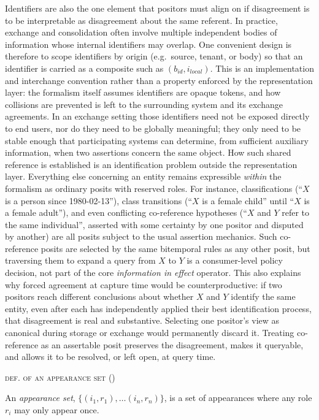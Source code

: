\documentclass[a4paper,fleqn]{cas-sc}
\newcounter{majorcount}
\newcommand{\deffy}[3]{
	\vspace{2ex}
	\refstepcounter{majorcount}
	\noindent\textsc{#1} {\normalfont(\arabic{majorcount})}
	\\\begin{small}
	\noindent #2%
	\label{Def:#3}
	\end{small}
	\vspace{2ex}
}
\begin{document}
Identifiers are also the one element that positors must align on if disagreement is to be interpretable as disagreement about the same referent. In practice, exchange and consolidation often involve multiple independent bodies of information whose internal identifiers may overlap. One convenient design is therefore to scope identifiers by origin (e.g.\ source, tenant, or body) so that an identifier is carried as a composite such as \((b_{id}, i_{local})\). This is an implementation and interchange convention rather than a property enforced by the representation layer: the formalism itself assumes identifiers are opaque tokens, and how collisions are prevented is left to the surrounding system and its exchange agreements. In an exchange setting those identifiers need not be exposed directly to end users, nor do they need to be globally meaningful; they only need to be stable enough that participating systems can determine, from sufficient auxiliary information, when two assertions concern the same object. How such shared reference is established is an identification problem outside the representation layer. Everything else concerning an entity remains expressible \emph{within} the formalism as ordinary posits with reserved roles. For instance, classifications (``\(X\) is a person since 1980-02-13''), class transitions (``\(X\) is a female child'' until ``\(X\) is a female adult''), and even conflicting co-reference hypotheses (``\(X\) and \(Y\) refer to the same individual'', asserted with some certainty by one positor and disputed by another) are all posits subject to the usual assertion mechanics. Such co-reference posits are selected by the same bitemporal rules as any other posit, but traversing them to expand a query from \(X\) to \(Y\) is a consumer-level policy decision, not part of the core \emph{information in effect} operator. This also explains why forced agreement at capture time would be counterproductive: if two positors reach different conclusions about whether \(X\) and \(Y\) identify the same entity, even after each has independently applied their best identification process, that disagreement is real and substantive. Selecting one positor's view as canonical during storage or exchange would permanently discard it. Treating co-reference as an assertable posit preserves the disagreement, makes it queryable, and allows it to be resolved, or left open, at query time.

\deffy{def. of an appearance set}{%
An \emph{appearance set}, \(\{(i_1, r_1), \ldots (i_n, r_n)\}\), is a set of appearances where any role \(r_i\) may only appear once.}{appearanceset}
\end{document}
